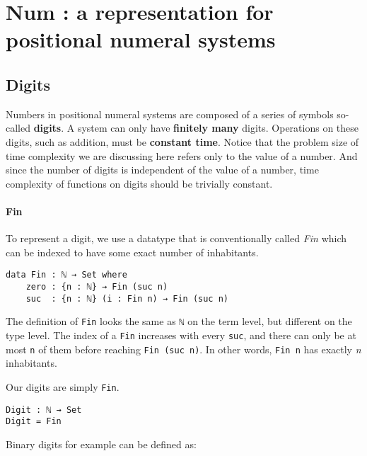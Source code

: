 \documentclass[14pt, a4paper]{article}
\begin{document}
\section{Num : a representation for positional numeral systems}\label{representation}


\subsection{Digits}

Numbers in positional numeral systems are composed of a series of symbols
so-called \textbf{digits}. A system can only have \textbf{finitely many} digits.
Operations on these digits, such as addition, must be \textbf{constant time}.
Notice that the problem size of time complexity we are discussing here refers
only to the value of a number. And since the number of digits is independent of
the value of a number, time complexity of functions on digits should be trivially
constant.

\paragraph{Fin}
To represent a digit, we use a datatype that is conventionally called \textit{Fin}
which can be indexed to have some exact number of inhabitants.

\begin{lstlisting}
data Fin : ℕ → Set where
    zero : {n : ℕ} → Fin (suc n)
    suc  : {n : ℕ} (i : Fin n) → Fin (suc n)
\end{lstlisting}

The definition of {\lstinline|Fin|} looks the same as {\lstinline|ℕ|} on the term
level, but different on the type level. The index of a {\lstinline|Fin|} increases
with every {\lstinline|suc|}, and there can only be at most {\lstinline|n|} of
them before reaching {\lstinline|Fin (suc n)|}. In other words, {\lstinline|Fin n|}
has exactly \textit{n} inhabitants.

Our digits are simply {\lstinline|Fin|}.

\begin{lstlisting}
Digit : ℕ → Set
Digit = Fin
\end{lstlisting}

Binary digits for example can be defined as:
\end{document}
